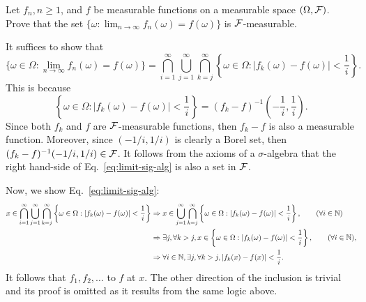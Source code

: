 \begin{problem}{1}
    Let $f_n, n\geq 1$, and $f$ be measurable functions on a measurable space $(\Omega,\mathcal{F})$. Prove that the set $\{\omega: \lim_{n\to\infty} f_n(\omega) = f(\omega)\}$ is $\mathcal{F}$-measurable.
\end{problem}
\begin{solution}
    It suffices to show that 
    \begin{equation}\label{eq:limit-sig-alg}
        \{\omega \in \Omega: \lim_{n\to\infty} f_n(\omega) = f(\omega)\} = \bigcap_{i=1}^\infty \bigcup_{j=1}^\infty \bigcap_{k=j}^\infty \left\{\omega \in \Omega : |f_k(\omega) - f(\omega)| < \frac{1}{i}\right\}.
    \end{equation}
    This is because
    \[
        \left\{\omega \in \Omega : |f_k(\omega) - f(\omega)| < \frac{1}{i}\right\} =  (f_k - f)^{-1}\left(-\frac{1}{i},\frac{1}{i}\right).
    \]
    Since both $f_k$ and $f$ are $\mathcal{F}$-measurable functions, then $f_k - f$ is also a measurable function. Moreover, since $(-1/i, 1/i)$ is clearly a Borel set, then $(f_k - f)^{-1}(-1/i, 1/i) \in \mathcal{F}$. It follows from the axioms of a $\sigma$-algebra that the right hand-side of Eq.~\ref{eq:limit-sig-alg} is also a set in $\mathcal{F}$. 

    Now, we show Eq.~\ref{eq:limit-sig-alg}:
    \begin{align*}
        x \in \bigcap_{i=1}^\infty \bigcup_{j=1}^\infty \bigcap_{k=j}^\infty \left\{\omega \in \Omega : |f_k(\omega) - f(\omega)| < \frac{1}{i}\right\} &\Rightarrow x \in \bigcup_{j=1}^\infty\bigcap_{k=j}^\infty \left\{\omega \in \Omega : |f_k(\omega) - f(\omega)| <  \frac{1}{i}\right\}, \tag{$\forall i \in \N$} \\
        &\Rightarrow \exists j, \forall k > j, x\in \left\{\omega \in \Omega : |f_k(\omega) - f(\omega)| <  \frac{1}{i}\right\}, \tag{$\forall i \in \N$}, \\
        &\Rightarrow \forall i \in \N, \exists j, \forall k > j, |f_k(x) - f(x)| < \frac{1}{i}.
    \end{align*}
    It follows that $f_1,f_2,\ldots$ to $f$ at $x$. The other direction of the inclusion is trivial and its proof is omitted as it results from the same logic above.
\end{solution}

